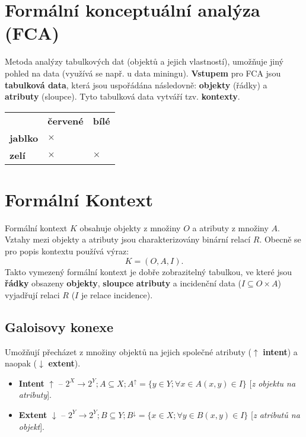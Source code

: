 \section{Formální konceptuální analýza (FCA)}
Metoda analýzy tabulkových dat (objektů a jejich vlastností), umožňuje jiný pohled na data (využívá se např. u data miningu). \textbf{Vstupem} pro FCA jsou \textbf{tabulková data}, která jsou uspořádána následovně: \textbf{objekty} (řádky) a \textbf{atributy} (sloupce). Tyto tabulková data vytváří tzv. \textbf{kontexty}.

\begin{table}[H]
    \centering
    \begin{tabular}{l|l|l}
                        & \textbf{červené} & \textbf{bílé} \\
        \hhline
        \textbf{jablko} & $\times$         &               \\
        \textbf{zelí}   & $\times$         & $\times$
    \end{tabular}
\end{table}

\section{Formální Kontext}
Formální kontext $K$ obsahuje objekty z množiny $O$ a atributy z množiny $A$. Vztahy mezi objekty a atributy jsou charakterizovány binární relací $ R $. Obecně se pro popis kontextu používá výraz:
\begin{equation}
    K = (O, A, I).
\end{equation}
Takto vymezený formální kontext je dobře zobrazitelný tabulkou, ve které jsou \textbf{řádky} obsazeny \textbf{objekty}, \textbf{sloupce} \textbf{atributy} a incidenční data ($I \subseteq O \times A$) vyjadřují relaci $ R $ ($I$ je relace incidence).

\subsection{Galoisovy konexe}
Umožňují přecházet z množiny objektů na jejich společné atributy ($\uparrow$ \textbf{intent}) a naopak ($\downarrow$ \textbf{extent}).

\begin{itemize}
    \item \textbf{Intent} $\uparrow$ -- $2^X \rightarrow 2^Y; A \subseteq X; A^\uparrow = \{y \in Y; \forall x \in A (x, y) \in I\}$ [\textit{z objektu na atributy}].
    \item \textbf{Extent} $\downarrow$ -- $2^Y \rightarrow 2^Y; B \subseteq Y; B^\downarrow = \{x \in X; \forall y \in B (x, y) \in I\}$ [\textit{z atributů na objekt}].
\end{itemize}


